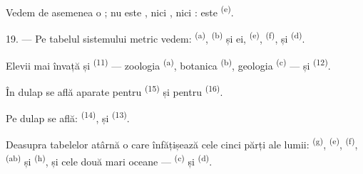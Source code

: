 Vedem de asemenea o ; nu este , nici
, nici : este 
\textsuperscript{(e)}.

19. --- Pe tabelul sistemului metric vedem: 
\textsuperscript{(a)},  \textsuperscript{(b)} și
 ei,  \textsuperscript{(e)},
 \textsuperscript{(f)},  și  \textsuperscript{(d)}.

Elevii mai învață și  \textsuperscript{(11)} ---
zoologia \textsuperscript{(a)}, botanica \textsuperscript{(b)}, geologia
\textsuperscript{(c)} --- și  \textsuperscript{(12)}.

În dulap se află aparate pentru  \textsuperscript{(15)} și pentru
 \textsuperscript{(16)}.

Pe dulap se află:  \textsuperscript{(14)},  și
 \textsuperscript{(13)}.

Deasupra tabelelor atârnă o  care înfățișează cele cinci părți ale
lumii:  \textsuperscript{(g)}, 
\textsuperscript{(e)},  \textsuperscript{(f)}, 
\textsuperscript{(ab)} și  \textsuperscript{(h)}, și cele două
mari oceane ---  \textsuperscript{(c)} și 
\textsuperscript{(d)}.
\VUsaut{6.0mm}
\VUfilet{22mm}
